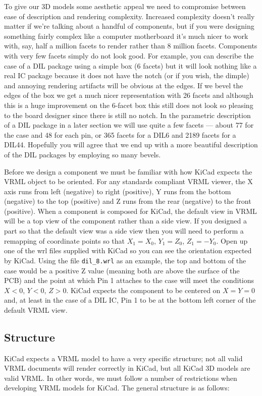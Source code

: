 \documentclass[a4paper, dvipdfm]{article}
\begin{document}
To give our 3D models some aesthetic appeal we need to compromise between ease of description and rendering
complexity.  Increased complexity doesn't really matter if we're talking about a handful of components, but if you
were designing something fairly complex like a computer motherboard it's much nicer to work with, say, half a million
facets to render rather than 8 million facets. Components with very few facets simply do not look good. For example, you
can describe the case of a DIL package using a simple box (6 facets) but it will look nothing like a real
IC package because it does not have the notch (or if you wish, the dimple) and annoying rendering artifacts
will be obvious at the edges. If we bevel the edges of the box we get a much nicer representation with 26 facets
and although this is a huge improvement on the 6-facet box this still does not look so pleasing to the
board designer since there is still no notch. In the parametric description of a DIL package in a later section
we will use quite a few facets --- about 77 for the case and 48 for each pin, or 365 facets for a DIL6 and
2189 facets for a DIL44. Hopefully you will agree that we end up with a more beautiful description of the DIL packages
by employing so many bevels.

Before we design a component we must be familiar with how KiCad expects the VRML object to be oriented. For any
standards compliant VRML viewer, the X axis runs from left (negative) to right (positive), Y runs from the
bottom (negative) to the top (positive) and Z runs from the rear (negative) to the front (positive). When a
component is composed for KiCad, the default view in VRML will be a top view of the component rather than a
side view. If you designed a part so that the default view was a side view then you will need to perform a
remapping of coordinate points so that $X_1=X_0$, $Y_1=Z_0$, $Z_1=-Y_0$. Open up one of the wrl files supplied with KiCad so you
can see the orientation expected by KiCad. Using the file \verb~dil_8.wrl~ as an example, the top and
bottom of the case would be a positive Z value (meaning both are above the surface of the PCB) and the point at
which Pin 1 attaches to the case will meet the conditions $X<0$, $Y<0$, $Z>0$. KiCad expects the component to be centered
on $X=Y=0$ and, at least in the case of a DIL IC, Pin 1 to be at the bottom left corner of the default VRML view.

\subsection{Structure}
KiCad expects a VRML model to have a very specific structure; not all valid VRML documents will render
correctly in KiCad, but all KiCad 3D models are valid VRML.  In other words, we must follow a number of
restrictions when developing VRML models for KiCad. The general structure is as follows:
\end{document}
